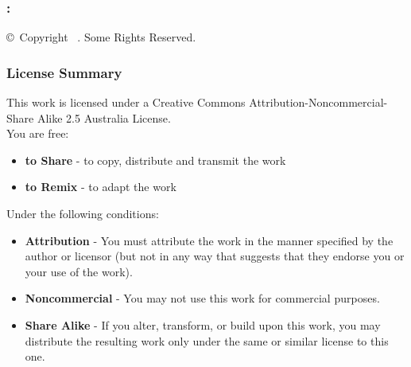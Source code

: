 
\newpage
\begin{flushleft}
\begin{small}

\vspace*{\fill}

\subsubsection*{\mybooktitle: \mybooksubtitle}
\copyright\ Copyright \mybookdate\ \mybookauthor. Some Rights Reserved. \\

\subsubsection*{License Summary}
This work is licensed under a Creative Commons Attribution-Noncommercial-Share Alike 2.5 Australia License. \\

You are free:
\begin{itemize}
	\item \textbf{to Share} - to copy, distribute and transmit the work
	\item \textbf{to Remix} - to adapt the work
\end{itemize}

Under the following conditions:
\begin{itemize}
	\item \textbf{Attribution} - You must attribute the work in the manner specified by the author or licensor (but not in any way that suggests that they endorse you or your use of the work).
	\item \textbf{Noncommercial} - You may not use this work for commercial purposes.
	\item \textbf{Share Alike} - If you alter, transform, or build upon this work, you may distribute the resulting work only under the same or similar license to this one.
\end{itemize}


\end{small}
\end{flushleft}

